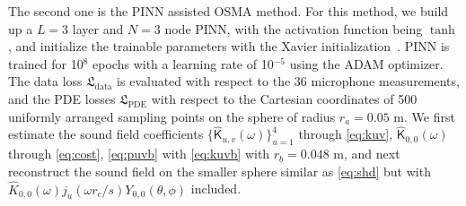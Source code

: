 \documentclass[11pt]{article}
\begin{document}
The second one is the PINN assisted OSMA method. For this method, we build up a $L=3$ layer 
and $N=3$ node PINN, with the activation function being $\tanh$, and 
initialize the trainable parameters with the Xavier initialization~\cite{glorot2010understanding}.
PINN is trained for 10$^8$ epochs with a learning rate of 10$^{-5}$ 
using the ADAM optimizer. 
The data loss $\mathfrak{L}_\mathrm{data}$ is evaluated with respect to the 
36 microphone measurements, and the PDE losses  $\mathfrak{L}_{\mathrm{PDE}}$  
with respect to the Cartesian coordinates of 500 uniformly arranged sampling 
points on the sphere of radius $r_a=0.05$ m.
We first estimate the sound field coefficients $\{\hat{\mathsf{K}}_{u,v}(\omega)\}_{u=1}^{4}$ 
through \eqref{eq:kuv}, $\hat{\mathsf{K}}_{0,0}(\omega)$ through \eqref{eq:cost},
\eqref{eq:puvb} with \eqref{eq:kuvb} with $r_b=0.048$ m, 
and next reconstruct the sound field on the smaller sphere similar as \eqref{eq:shd} but with 
$\hat{K}_{0,0}(\omega)j_u(\omega{r_c}/s)Y_{0,0}(\theta,\phi)$ included. 
\end{document}
